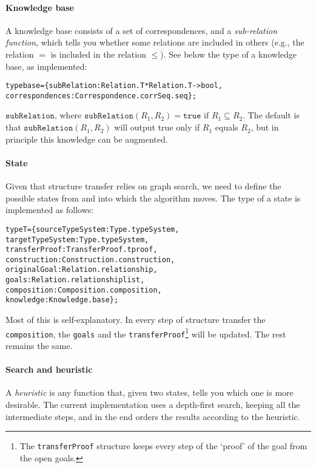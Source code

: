 \documentclass[a4paper]{article}
\theoremstyle{definition}
\begin{document}
	\paragraph{Knowledge base} A knowledge base consists of a set of correspondences, and a \textit{sub-relation function}, which tells you whether some relations are included in others (e.g., the relation $=$ is included in the relation $\leq$). See below the type of a knowledge base, as implemented:
	\begin{alltt}
type base = \{subRelation : Relation.T * Relation.T -> bool,
             correspondences : Correspondence.corr Seq.seq\};
	\end{alltt}
	 $\mathtt{subRelation}$, where $\mathtt{subRelation}(R_1,R_2) = \mathtt{true}$ if $R_1 \subseteq R_2$. The default is that $\mathtt{subRelation}(R_1,R_2)$ will output true only if $R_1$ equals $R_2$, but in principle this knowledge can be augmented.
	
	\paragraph{State}
	 Given that structure transfer relies on graph search, we need to define the possible states from and into which the algorithm moves. The type of a state is implemented as follows:
\begin{alltt}
type T = \{sourceTypeSystem : Type.typeSystem,
          targetTypeSystem : Type.typeSystem,
          transferProof : TransferProof.tproof,
          construction : Construction.construction,
          originalGoal : Relation.relationship,
          goals : Relation.relationship list,
          composition : Composition.composition,
          knowledge : Knowledge.base\};
\end{alltt}
	Most of this is self-explanatory. 
	In every step of structure transfer the \texttt{composition}, the \texttt{goals} and the \texttt{transferProof}\footnote{The \texttt{transferProof} structure keeps every step of the `proof' of the goal from the open goals.} will be updated. The rest remains the same.
	
	\paragraph{Search and heuristic}
	A \textit{heuristic} is any function that, given two states, tells you which one is more desirable. The current implementation uses a depth-first search, keeping all the intermediate steps, and in the end orders the results according to the heuristic.
	
\end{document}
